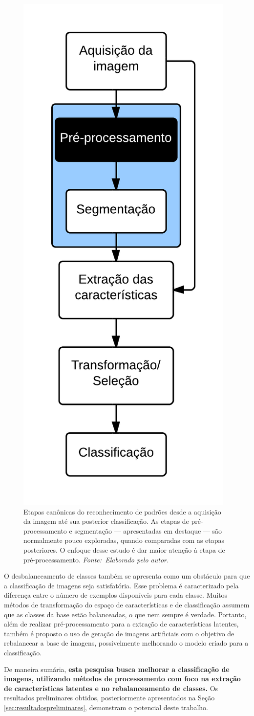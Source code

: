 \begin{figure}[!ht]
 \begin{center}
   \includegraphics[width=0.3\linewidth]{figuras/flow.png}
 \end{center}
 \caption[Etapas canônicas do reconhecimento de padrões desde a aquisição da imagem até sua posterior classificação.]{Etapas canônicas do reconhecimento de padrões desde a aquisição da imagem até sua posterior classificação. As etapas de pré-processamento e segmentação --- apresentadas em destaque --- são normalmente pouco exploradas, quando comparadas com as etapas posteriores. O enfoque desse estudo é dar maior atenção à etapa de pré-processamento. \textit{Fonte:~Elaborado pelo autor.}}
 \label{fig:fluxo}
\end{figure}

\enlargethispage{-\baselineskip}

O desbalanceamento de classes também se apresenta como um obstáculo para que a classificação de imagens seja satisfatória. Esse problema é caracterizado pela diferença entre o número de exemplos disponíveis para cada classe. Muitos métodos de transformação do espaço de características e de classificação assumem que as classes da base estão balanceadas, o que nem sempre é verdade. Portanto, além de realizar pré\hyp{}processamento para a extração de características latentes, também é proposto o uso de geração de imagens artificiais com o objetivo de rebalancear a base de imagens, possivelmente melhorando o modelo criado para a classificação.

De maneira sumária, {\bf esta pesquisa busca melhorar a classificação de imagens, utilizando métodos de processamento com foco na extração de características latentes e no rebalanceamento de classes.} Os resultados preliminares obtidos, posteriormente apresentados na Seção \ref{sec:resultadospreliminares}, demonstram o potencial deste trabalho.

